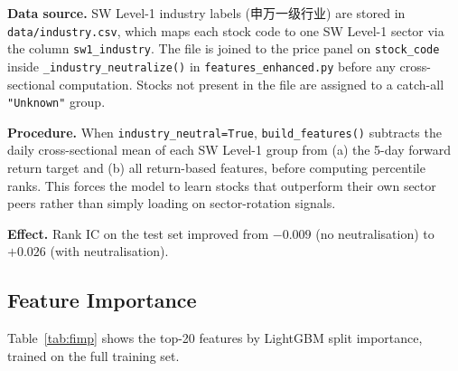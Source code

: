 \documentclass[11pt,a4paper]{article}
\begin{document}
\textbf{Data source.}
SW Level-1 industry labels (申万一级行业) are stored in
\texttt{data/industry.csv}, which maps each stock code to one SW Level-1
sector via the column \texttt{sw1\_industry}. The file is joined to the
price panel on \texttt{stock\_code} inside \texttt{\_industry\_neutralize()}
in \texttt{features\_enhanced.py} before any cross-sectional computation.
Stocks not present in the file are assigned to a catch-all
\texttt{"Unknown"} group.

\textbf{Procedure.}
When \texttt{industry\_neutral=True}, \texttt{build\_features()} subtracts
the daily cross-sectional mean of each SW Level-1 group from (a) the
5-day forward return target and (b) all return-based features, before
computing percentile ranks. This forces the model to learn stocks that
outperform their own sector peers rather than simply loading on
sector-rotation signals.

\textbf{Effect.} Rank IC on the test set improved from $-0.009$ (no
neutralisation) to $+0.026$ (with neutralisation).

\subsection{Feature Importance}

Table~\ref{tab:fimp} shows the top-20 features by LightGBM split
importance, trained on the full training set.
\end{document}
